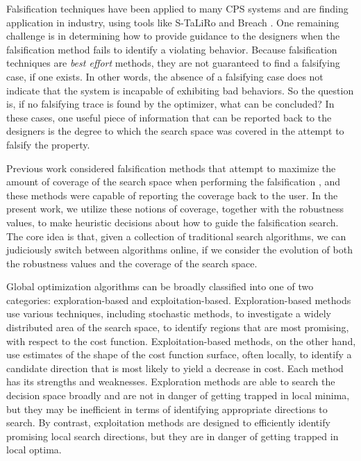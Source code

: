 Falsification techniques have been applied to many CPS
systems and are finding application in industry, using tools like
S-TaLiRo and Breach \cite{TaliroLFS11,BreachCAV10}. One remaining
challenge is in determining how to provide guidance to the designers
when the falsification method fails to identify a violating behavior.
Because falsification techniques are \emph{best effort} methods, they
are not guaranteed to find a falsifying case, if one exists.  In other
words, the absence of a falsifying case does not indicate that the
system is incapable of exhibiting bad behaviors.  So the question is,
if no falsifying trace is found by the optimizer, what can be
concluded? In these cases, one useful piece of information that can be
reported back to the designers is the degree to which the search space
was covered in the attempt to falsify the property.

Previous work considered falsification methods that attempt to
maximize the amount of coverage of the search space when performing
the falsification \cite{Dreossi2015,CAV2017}, and these methods were
capable of reporting the coverage back to the user.  In the present
work, we utilize these notions of coverage, together with the
robustness values, to make heuristic decisions about how to guide the
falsification search.  The core idea is that, given a collection of
traditional search algorithms, we can judiciously switch between
algorithms online, if we consider the evolution of both the robustness
values and the coverage of the search space.

Global optimization algorithms can be broadly classified into one of two
categories: exploration-based and exploitation-based.
Exploration-based methods use various techniques, including stochastic
methods, to investigate a widely distributed area of the search space,
to identify regions that are most promising, with respect to the cost
function. Exploitation-based methods, on the other hand, use
estimates of the shape of the cost function surface, often locally, to
identify a candidate direction that is most likely to yield a decrease
in cost.  Each method has its strengths and weaknesses.  Exploration
methods are able to search the decision space broadly and are not in
danger of getting trapped in local minima, but they may be inefficient
in terms of identifying appropriate directions to search.  By
contrast, exploitation methods are designed to efficiently identify
promising local search directions, but they are in danger of getting
trapped in local optima.





